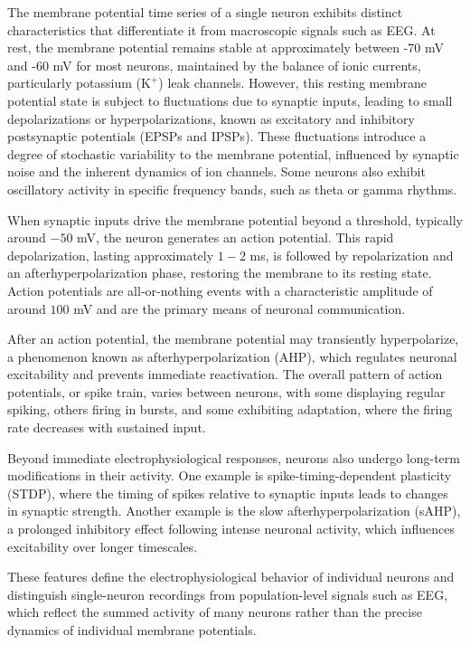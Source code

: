 \documentclass[a4paper,9pt]{extarticle}
\begin{document}
\begin{multicols}{2}



The membrane potential time series of a single neuron exhibits distinct characteristics that differentiate it from macroscopic signals such as EEG. At rest, the membrane potential remains stable at approximately between -70 mV and -60 mV for most neurons, maintained by the balance of ionic currents, particularly potassium (\(\text{K}^+\)) leak channels. However, this resting membrane potential state is subject to fluctuations due to synaptic inputs, leading to small depolarizations or hyperpolarizations, known as excitatory and inhibitory postsynaptic potentials (EPSPs and IPSPs). These fluctuations introduce a degree of stochastic variability to the membrane potential, influenced by synaptic noise and the inherent dynamics of ion channels. Some neurons also exhibit oscillatory activity in specific frequency bands, such as theta or gamma rhythms.

When synaptic inputs drive the membrane potential beyond a threshold, typically around \(-50\) mV, the neuron generates an action potential. This rapid depolarization, lasting approximately \(1-2\) ms, is followed by repolarization and an afterhyperpolarization phase, restoring the membrane to its resting state. Action potentials are all-or-nothing events with a characteristic amplitude of around \(100\) mV and are the primary means of neuronal communication.

After an action potential, the membrane potential may transiently hyperpolarize, a phenomenon known as afterhyperpolarization (AHP), which regulates neuronal excitability and prevents immediate reactivation. The overall pattern of action potentials, or spike train, varies between neurons, with some displaying regular spiking, others firing in bursts, and some exhibiting adaptation, where the firing rate decreases with sustained input.

Beyond immediate electrophysiological responses, neurons also undergo long-term modifications in their activity. One example is spike-timing-dependent plasticity (STDP), where the timing of spikes relative to synaptic inputs leads to changes in synaptic strength. Another example is the slow afterhyperpolarization (sAHP), a prolonged inhibitory effect following intense neuronal activity, which influences excitability over longer timescales.

These features define the electrophysiological behavior of individual neurons and distinguish single-neuron recordings from population-level signals such as EEG, which reflect the summed activity of many neurons rather than the precise dynamics of individual membrane potentials.


\end{multicols}
\end{document}
